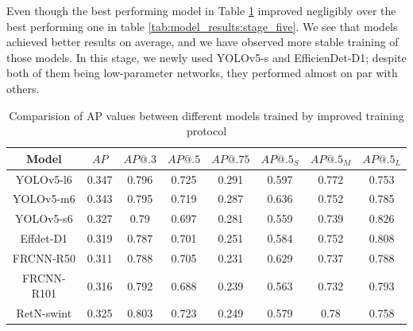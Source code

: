 Even though the best performing model in Table \ref{tab:improved:precision} improved negligibly over the best performing one in table \ref{tab:model_results:stage_five}. We see that models achieved better results on average, and we have observed more stable training of those models. In this stage, we newly used YOLOv5-s and EfficienDet-D1; despite both of them being low-parameter networks, they performed almost on par with others.
\begin{table}[H]
    \centering
    \begin{tabular}{|c|c|c|c|c|c|c|c|}
        \hline
        Model      & $AP$  & $AP@.3$ & $AP@.5$ & $AP@.75$ & $AP@.5_S$ & $AP@.5_M$ & $AP@.5_L$ \\ \hline
        YOLOv5-l6  & 0.347 & 0.796   & 0.725   & 0.291    & 0.597     & 0.772     & 0.753     \\ \hline
        YOLOv5-m6  & 0.343 & 0.795   & 0.719   & 0.287    & 0.636     & 0.752     & 0.785     \\ \hline
        YOLOv5-s6  & 0.327 & 0.79    & 0.697   & 0.281    & 0.559     & 0.739     & 0.826     \\ \hline
        Effdet-D1  & 0.319 & 0.787   & 0.701   & 0.251    & 0.584     & 0.752     & 0.808     \\ \hline
        FRCNN-R50  & 0.311 & 0.788   & 0.705   & 0.231    & 0.629     & 0.737     & 0.788     \\ \hline
        FRCNN-R101 & 0.316 & 0.792   & 0.688   & 0.239    & 0.563     & 0.732     & 0.793     \\ \hline
        RetN-swint & 0.325 & 0.803   & 0.723   & 0.249    & 0.579     & 0.78      & 0.758     \\ \hline
    \end{tabular}
    \caption{Comparision of AP values between different models trained by improved training protocol}
    \label{tab:improved:precision}
\end{table}



